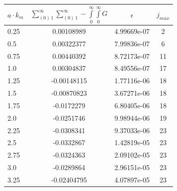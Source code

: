 \documentclass[twoside, 10pt]{article}
\begin{document}
\begin{multicols}{2}
\begin{center}
\begin{tabular}{ | l | c | c | c | }
\hline
$a \cdot k_m$ & $\sum\limits_{\left(0\right)\,1}^{\infty}\sum\limits_{\left(0\right)\,1}^{\infty}-\int\limits_{0}^{\infty}\int\limits_{0}^{\infty}G$ & $\epsilon$ & $j_{max}$ \\
\hline
0.25 & 0.00108989 & 4.99669e-07 & 2 \\
0.5 & 0.00322377 & 7.99836e-07 & 6 \\
0.75 & 0.00440392 & 8.72173e-07 & 11 \\
1.0 & 0.00304837 & 8.49556e-07 & 17 \\
1.25 & -0.00148115 & 1.77116e-06 & 18 \\
1.5 & -0.00870823 & 3.67271e-06 & 18 \\
1.75 & -0.0172279 & 6.80405e-06 & 18 \\
2.0 & -0.0251746 & 9.98944e-06 & 19 \\
2.25 & -0.0308341 & 9.37033e-06 & 23 \\
2.5 & -0.0332867 & 1.42819e-05 & 23 \\
2.75 & -0.0324363 & 2.09102e-05 & 23 \\
3.0 & -0.0289864 & 2.96151e-05 & 23 \\
3.25 & -0.02404795 & 4.07897e-05 & 23 \\

\end{tabular}
\end{center}
\end{multicols}
\end{document}
